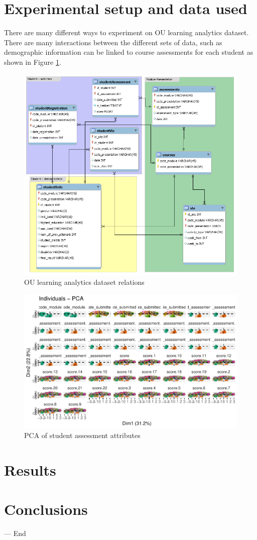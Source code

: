 \documentclass[12pt]{article}
\begin{document}
\section{Experimental setup and data used}

There are many different ways to experiment on OU learning analytics dataset. There are many interactions between the different sets of data, such as demographic
information can be linked to course assessments for each student as shown in Figure \ref{fig:db_model}.

 \begin{figure}[h]
 \centering
 \includegraphics[scale=0.5]{db_model.png}
 \caption{OU learning analytics dataset relations}
 \label{fig:db_model}
 \end{figure}
 
\begin{figure}[h]
 \centering
 \includegraphics[scale=0.8]{PCA_Assessments_first50.pdf}
 \caption{PCA of student assessment attributes}
 \label{fig:pca}
 \end{figure}

\section{Results}

\section{Conclusions}


\hspace{1 cm}--- End

\clearpage


\end{document}
